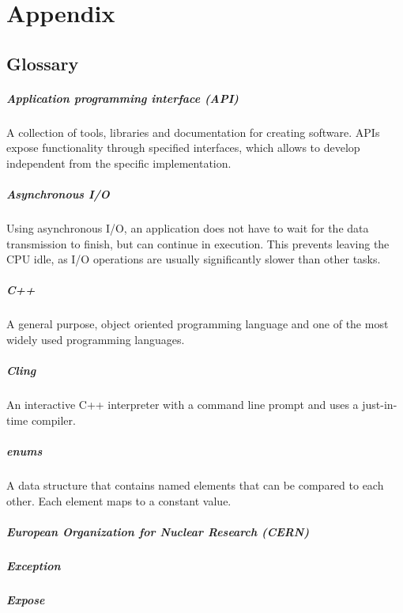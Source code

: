 \chapter{Appendix}
\section{Glossary}
\paragraph{Application programming interface (API)}
A collection of tools, libraries and documentation for creating software. APIs expose functionality through specified interfaces, which allows to develop independent from the specific implementation.
\paragraph{Asynchronous I/O}
Using asynchronous I/O, an application does not have to wait for the data transmission to finish, but can continue in execution. This prevents leaving the CPU idle, as I/O operations are usually significantly slower than other tasks.
\paragraph{C++}
A general purpose, object oriented programming language and one of the most widely used programming languages.
\paragraph{Cling}
An interactive C++ interpreter with a command line prompt and uses a just-in-time compiler.
\paragraph{enums}
A data structure that contains named elements that can be compared to each other. Each element maps to a constant value.
\paragraph{European Organization for Nuclear Research (CERN)}
\paragraph{Exception}
\paragraph{Expose}
